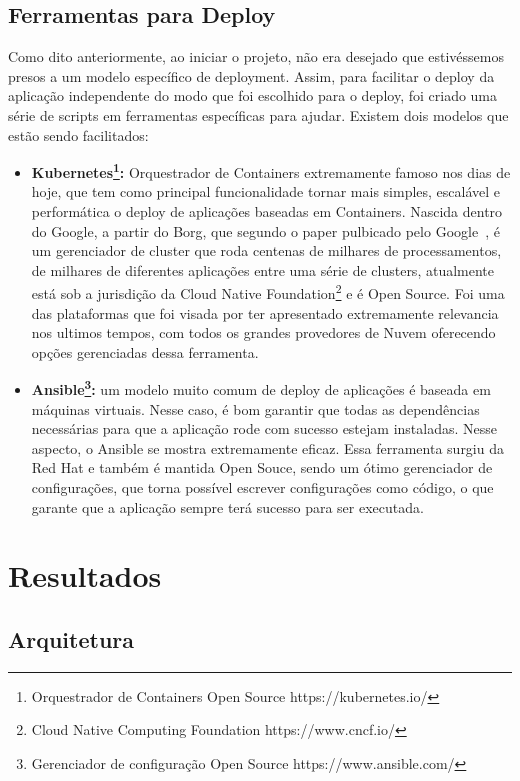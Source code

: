 \documentclass[11pt,twoside]{article}
\begin{document}
\subsection{Ferramentas para Deploy}

Como dito anteriormente, ao iniciar o projeto, não era desejado que estivéssemos presos a um modelo específico de deployment. Assim, para facilitar o deploy da aplicação independente
do modo que foi escolhido para o deploy, foi criado uma série de scripts em ferramentas específicas para ajudar. Existem dois modelos que estão sendo facilitados:

\begin{itemize}
  \item \textbf{Kubernetes\footnote{Orquestrador de Containers Open Source https://kubernetes.io/}:} Orquestrador de Containers extremamente famoso nos dias de hoje, que tem como principal funcionalidade tornar mais simples, escalável e performática o deploy 
  de aplicações baseadas em Containers. Nascida dentro do Google, a partir do Borg, que segundo o paper pulbicado pelo Google~\cite{BORG}, é um gerenciador de cluster que roda centenas de milhares de processamentos,
  de milhares de diferentes aplicações entre uma série de clusters,
  atualmente está sob a jurisdição da Cloud Native Foundation\footnote{Cloud Native Computing Foundation https://www.cncf.io/} e é Open Source. Foi uma
  das plataformas que foi visada por ter apresentado extremamente relevancia nos ultimos tempos, com todos os grandes provedores de Nuvem oferecendo opções gerenciadas dessa 
  ferramenta.
  \item \textbf{Ansible\footnote{Gerenciador de configuração Open Source https://www.ansible.com/}:} um modelo muito comum de deploy de aplicações é baseada em máquinas virtuais. Nesse caso, é bom garantir que todas as dependências necessárias para que a 
  aplicação rode com sucesso estejam instaladas. Nesse aspecto, o Ansible se mostra extremamente eficaz. Essa ferramenta surgiu da Red Hat e também é mantida Open Souce, sendo um
  ótimo gerenciador de configurações, que torna possível escrever configurações como código, o que garante que a aplicação sempre terá sucesso para ser executada.
\end{itemize}

\section{Resultados}

\subsection{Arquitetura}
\end{document}
